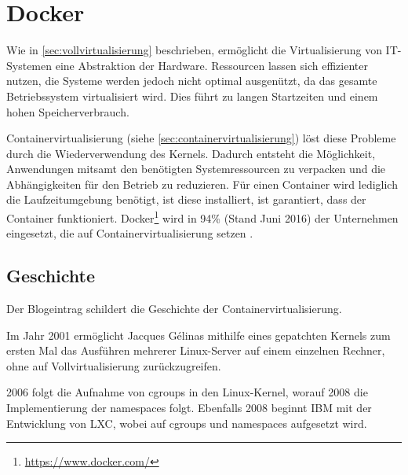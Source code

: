 
\chapter{Docker}
\label{cha:docker}
Wie in \cref{sec:vollvirtualisierung} beschrieben, ermöglicht die Virtualisierung von IT-Systemen eine Abstraktion der Hardware.
Ressourcen lassen sich effizienter nutzen, die Systeme werden jedoch nicht optimal ausgenützt, da das gesamte Betriebssystem virtualisiert wird.
Dies führt zu langen Startzeiten und einem hohen Speicherverbrauch.

Containervirtualisierung (siehe \cref{sec:containervirtualisierung}) löst diese Probleme durch die Wiederverwendung des Kernels.
Dadurch entsteht die Möglichkeit, Anwendungen mitsamt den benötigten Systemressourcen zu verpacken und die Abhängigkeiten für den Betrieb zu reduzieren.
Für einen Container wird lediglich die Laufzeitumgebung benötigt, ist diese installiert, ist garantiert, dass der Container funktioniert.
Docker\footnote{\url{https://www.docker.com/}} wird in 94\% (Stand Juni 2016) der Unternehmen eingesetzt, die auf Containervirtualisierung setzen \autocite{ContainerAdoption}.

\section{Geschichte}
\label{sec:docker-history}
Der Blogeintrag \autocite{redhat-container-history:online} schildert die Geschichte der Containervirtualisierung.

Im Jahr 2001 ermöglicht Jacques Gélinas mithilfe eines gepatchten Kernels zum ersten Mal das Ausführen mehrerer Linux-Server auf einem einzelnen Rechner, ohne auf Vollvirtualisierung zurückzugreifen.

2006 folgt die Aufnahme von cgroups in den Linux-Kernel, worauf 2008 die Implementierung der namespaces folgt.
Ebenfalls 2008 beginnt IBM mit der Entwicklung von LXC, wobei auf cgroups und namespaces aufgesetzt wird.

